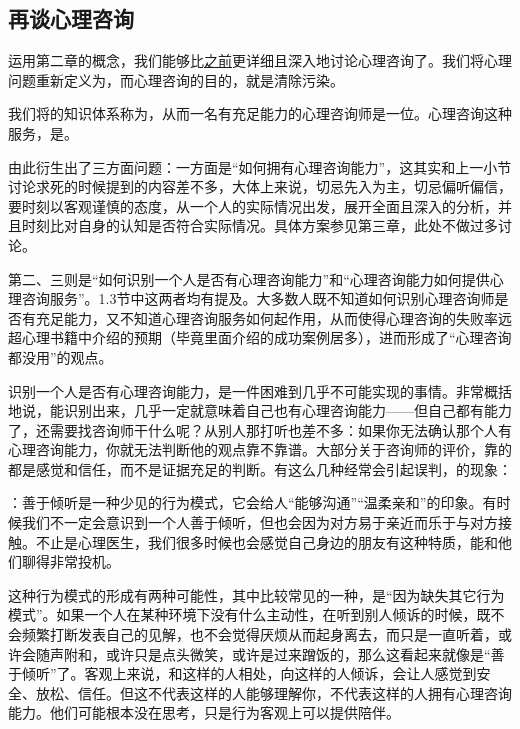 \subsection{再谈心理咨询}
运用第二章的概念，我们能够比\hyperref[sec:实操1]{之前}更详细且深入地讨论心理咨询了。我们将心理问题重新定义为，而心理咨询的目的，就是清除污染。

我们将的知识体系称为，从而一名有充足能力的心理咨询师是一位。心理咨询这种服务，是。

由此衍生出了三方面问题：一方面是“如何拥有心理咨询能力”，这其实和上一小节讨论求死的时候提到的内容差不多，大体上来说，切忌先入为主，切忌偏听偏信，要时刻以客观谨慎的态度，从一个人的实际情况出发，展开全面且深入的分析，并且时刻比对自身的认知是否符合实际情况。具体方案参见第三章，此处不做过多讨论。

第二、三则是“如何识别一个人是否有心理咨询能力”和“心理咨询能力如何提供心理咨询服务”。1.3节中这两者均有提及。大多数人既不知道如何识别心理咨询师是否有充足能力，又不知道心理咨询服务如何起作用，从而使得心理咨询的失败率远超心理书籍中介绍的预期（毕竟里面介绍的成功案例居多），进而形成了“心理咨询都没用”的观点。


识别一个人是否有心理咨询能力，是一件困难到几乎不可能实现的事情。非常概括地说，能识别出来，几乎一定就意味着自己也有心理咨询能力——但自己都有能力了，还需要找咨询师干什么呢？从别人那打听也差不多：如果你无法确认那个人有心理咨询能力，你就无法判断他的观点靠不靠谱。大部分关于咨询师的评价，靠的都是感觉和信任，而不是证据充足的判断。有这么几种经常会引起误判，的现象：

：善于倾听是一种少见的行为模式，它会给人“能够沟通”“温柔亲和”的印象。有时候我们不一定会意识到一个人善于倾听，但也会因为对方易于亲近而乐于与对方接触。不止是心理医生，我们很多时候也会感觉自己身边的朋友有这种特质，能和他们聊得非常投机。

这种行为模式的形成有两种可能性，其中比较常见的一种，是“因为缺失其它行为模式”。如果一个人在某种环境下没有什么主动性，在听到别人倾诉的时候，既不会频繁打断发表自己的见解，也不会觉得厌烦从而起身离去，而只是一直听着，或许会随声附和，或许只是点头微笑，或许是过来蹭饭的，那么这看起来就像是“善于倾听”了。客观上来说，和这样的人相处，向这样的人倾诉，会让人感觉到安全、放松、信任。但这不代表这样的人能够理解你，不代表这样的人拥有心理咨询能力。他们可能根本没在思考，只是行为客观上可以提供陪伴。

